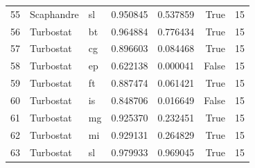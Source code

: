 \begin{tabular}{lllrrrr}
55 & Scaphandre & sl & 0.950845 & 0.537859 & True & 15 \\
56 & Turbostat & bt & 0.964884 & 0.776434 & True & 15 \\
57 & Turbostat & cg & 0.896603 & 0.084468 & True & 15 \\
58 & Turbostat & ep & 0.622138 & 0.000041 & False & 15 \\
59 & Turbostat & ft & 0.887474 & 0.061421 & True & 15 \\
60 & Turbostat & is & 0.848706 & 0.016649 & False & 15 \\
61 & Turbostat & mg & 0.925370 & 0.232451 & True & 15 \\
62 & Turbostat & mi & 0.929131 & 0.264829 & True & 15 \\
63 & Turbostat & sl & 0.979933 & 0.969045 & True & 15 \\
\bottomrule
\end{tabular}
